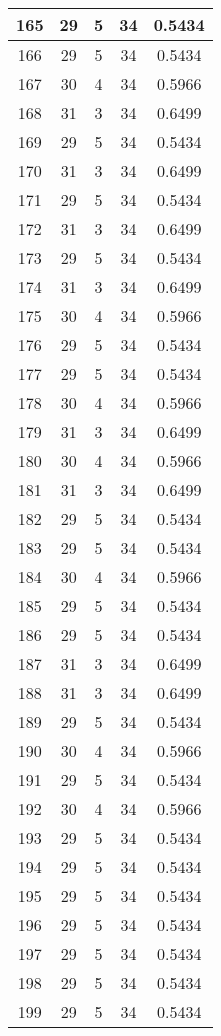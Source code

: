 \documentclass[letterpaper, 12pt]{article}
\begin{document}
\begin{longtable}{|c|c|c|c|c|}
\hline
165 & 29 & 5 & 34 & 0.5434 \\
\hline
166 & 29 & 5 & 34 & 0.5434 \\
\hline
167 & 30 & 4 & 34 & 0.5966 \\
\hline
168 & 31 & 3 & 34 & 0.6499 \\
\hline
169 & 29 & 5 & 34 & 0.5434 \\
\hline
170 & 31 & 3 & 34 & 0.6499 \\
\hline
171 & 29 & 5 & 34 & 0.5434 \\
\hline
172 & 31 & 3 & 34 & 0.6499 \\
\hline
173 & 29 & 5 & 34 & 0.5434 \\
\hline
174 & 31 & 3 & 34 & 0.6499 \\
\hline
175 & 30 & 4 & 34 & 0.5966 \\
\hline
176 & 29 & 5 & 34 & 0.5434 \\
\hline
177 & 29 & 5 & 34 & 0.5434 \\
\hline
178 & 30 & 4 & 34 & 0.5966 \\
\hline
179 & 31 & 3 & 34 & 0.6499 \\
\hline
180 & 30 & 4 & 34 & 0.5966 \\
\hline
181 & 31 & 3 & 34 & 0.6499 \\
\hline
182 & 29 & 5 & 34 & 0.5434 \\
\hline
183 & 29 & 5 & 34 & 0.5434 \\
\hline
184 & 30 & 4 & 34 & 0.5966 \\
\hline
185 & 29 & 5 & 34 & 0.5434 \\
\hline
186 & 29 & 5 & 34 & 0.5434 \\
\hline
187 & 31 & 3 & 34 & 0.6499 \\
\hline
188 & 31 & 3 & 34 & 0.6499 \\
\hline
189 & 29 & 5 & 34 & 0.5434 \\
\hline
190 & 30 & 4 & 34 & 0.5966 \\
\hline
191 & 29 & 5 & 34 & 0.5434 \\
\hline
192 & 30 & 4 & 34 & 0.5966 \\
\hline
193 & 29 & 5 & 34 & 0.5434 \\
\hline
194 & 29 & 5 & 34 & 0.5434 \\
\hline
195 & 29 & 5 & 34 & 0.5434 \\
\hline
196 & 29 & 5 & 34 & 0.5434 \\
\hline
197 & 29 & 5 & 34 & 0.5434 \\
\hline
198 & 29 & 5 & 34 & 0.5434 \\
\hline
199 & 29 & 5 & 34 & 0.5434 \\
\hline
\end{longtable}
\end{document}
